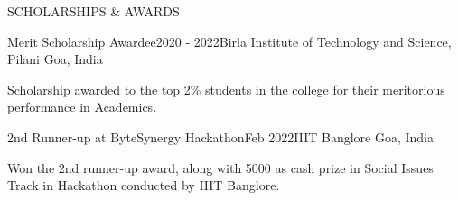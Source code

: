 
\begin{rSection}{SCHOLARSHIPS \& AWARDS}

    \begin{rSubsection}{Merit Scholarship Awardee}{2020 - 2022}{Birla Institute of Technology and Science, Pilani}{ Goa, India}
        \item Scholarship awarded to the top 2\% students in the college for their meritorious performance in Academics.
    \end{rSubsection}
        \begin{rSubsection}{2nd Runner-up at ByteSynergy Hackathon}{Feb 2022}{IIIT Banglore}{ Goa, India}
        \item Won the 2nd runner-up award, along with 5000 as cash prize in Social Issues Track in Hackathon conducted by IIIT Banglore.
    \end{rSubsection}

\end{rSection}